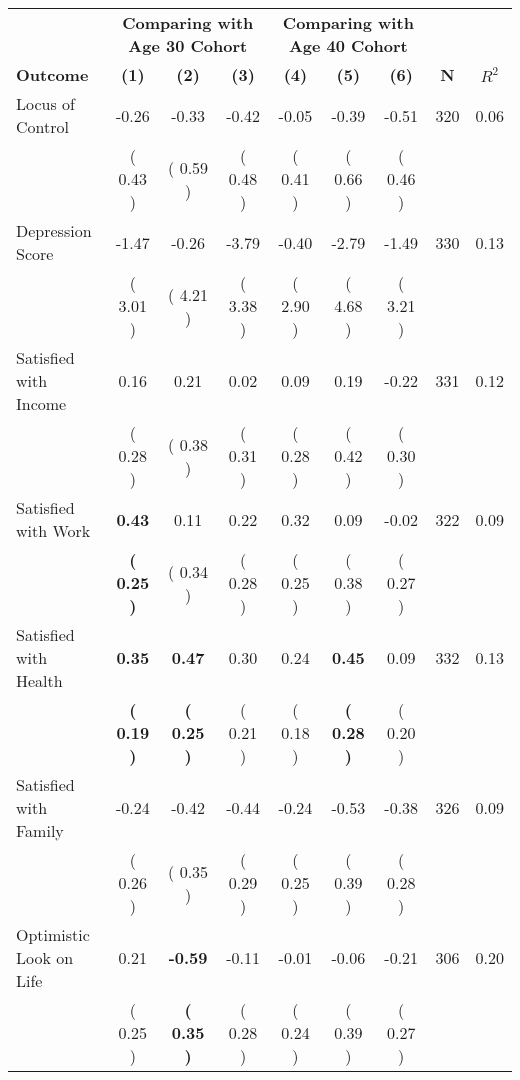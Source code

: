 \begin{tabular}{lcccccccc}
\toprule
 & \multicolumn{3}{c}{\textbf{Comparing with Age 30 Cohort}} & \multicolumn{3}{c}{\textbf{Comparing with Age 40 Cohort}} & \\
\cmidrule(lr){2-4} \cmidrule(lr){5-7} 
 \textbf{Outcome} & \textbf{(1)} & \textbf{(2)} & \textbf{(3)} & \textbf{(4)} & \textbf{(5)} & \textbf{(6)} & \textbf{N} & \textbf{$ R^2$} \\
\midrule
Locus of Control &     -0.26 &     -0.33 &     -0.42 &     -0.05 &     -0.39 &     -0.51 & 320 &       0.06 \\ 
 & (     0.43 ) & (     0.59 ) & (     0.48 ) & (     0.41 ) & (     0.66 ) & (     0.46 ) & \\
Depression Score &     -1.47 &     -0.26 &     -3.79 &     -0.40 &     -2.79 &     -1.49 & 330 &       0.13 \\ 
 & (     3.01 ) & (     4.21 ) & (     3.38 ) & (     2.90 ) & (     4.68 ) & (     3.21 ) & \\
Satisfied with Income &      0.16 &      0.21 &      0.02 &      0.09 &      0.19 &     -0.22 & 331 &       0.12 \\ 
 & (     0.28 ) & (     0.38 ) & (     0.31 ) & (     0.28 ) & (     0.42 ) & (     0.30 ) & \\
Satisfied with Work & \textbf{     0.43} &      0.11 &      0.22 &      0.32 &      0.09 &     -0.02 & 322 &       0.09 \\ 
 & \textbf{(     0.25 )} & (     0.34 ) & (     0.28 ) & (     0.25 ) & (     0.38 ) & (     0.27 ) & \\
Satisfied with Health & \textbf{     0.35} & \textbf{     0.47} &      0.30 &      0.24 & \textbf{     0.45} &      0.09 & 332 &       0.13 \\ 
 & \textbf{(     0.19 )} & \textbf{(     0.25 )} & (     0.21 ) & (     0.18 ) & \textbf{(     0.28 )} & (     0.20 ) & \\
Satisfied with Family &     -0.24 &     -0.42 &     -0.44 &     -0.24 &     -0.53 &     -0.38 & 326 &       0.09 \\ 
 & (     0.26 ) & (     0.35 ) & (     0.29 ) & (     0.25 ) & (     0.39 ) & (     0.28 ) & \\
Optimistic Look on Life &      0.21 & \textbf{    -0.59} &     -0.11 &     -0.01 &     -0.06 &     -0.21 & 306 &       0.20 \\ 
 & (     0.25 ) & \textbf{(     0.35 )} & (     0.28 ) & (     0.24 ) & (     0.39 ) & (     0.27 ) & \\

\end{tabular}
